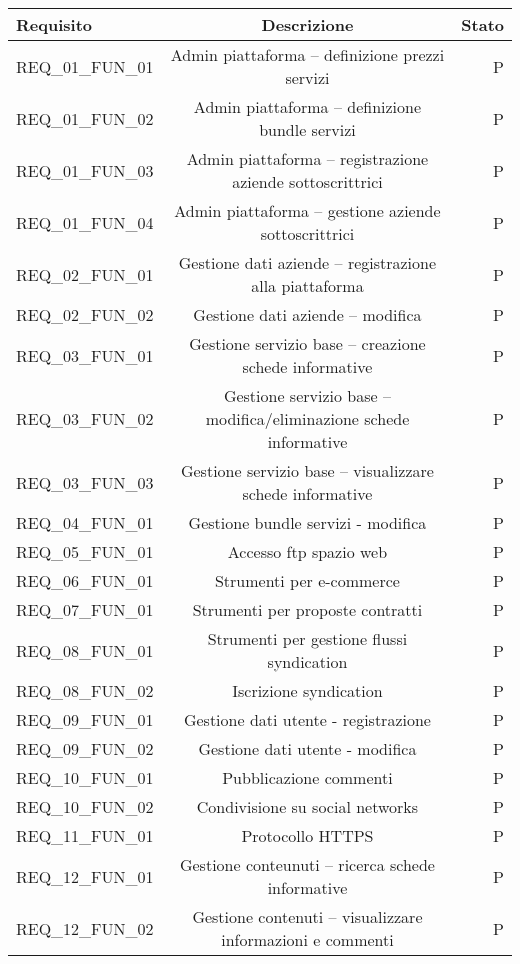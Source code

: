 

\begin{tabular}{||l||c|r||}
\hline
\hline
Requisito & Descrizione & Stato\\
\hline
\hline
REQ\_01\_FUN\_01 & Admin piattaforma – definizione prezzi servizi & P\\
\hline
REQ\_01\_FUN\_02 & Admin piattaforma – definizione bundle servizi & P\\
\hline
REQ\_01\_FUN\_03 & Admin piattaforma – registrazione aziende sottoscrittrici & P\\
\hline
REQ\_01\_FUN\_04 & Admin piattaforma – gestione aziende sottoscrittrici & P\\
\hline
REQ\_02\_FUN\_01 & Gestione dati aziende – registrazione alla piattaforma & P\\
\hline
REQ\_02\_FUN\_02 & Gestione dati aziende – modifica & P\\
\hline
REQ\_03\_FUN\_01 & Gestione servizio base – creazione schede informative & P\\
\hline
REQ\_03\_FUN\_02 & Gestione servizio base – modifica/eliminazione schede informative & P\\
\hline
REQ\_03\_FUN\_03 & Gestione servizio base – visualizzare schede informative & P\\
\hline
REQ\_04\_FUN\_01 & Gestione bundle servizi - modifica & P\\
\hline
REQ\_05\_FUN\_01 & Accesso ftp spazio web & P\\
\hline
REQ\_06\_FUN\_01 & Strumenti per e-commerce & P\\
\hline
REQ\_07\_FUN\_01 & Strumenti per proposte contratti & P\\
\hline
REQ\_08\_FUN\_01 & Strumenti per gestione flussi syndication & P\\
\hline
REQ\_08\_FUN\_02 & Iscrizione syndication & P\\
\hline
REQ\_09\_FUN\_01 & Gestione dati utente - registrazione & P\\
\hline
REQ\_09\_FUN\_02 & Gestione dati utente - modifica & P\\
\hline
REQ\_10\_FUN\_01 & Pubblicazione commenti & P\\
\hline
REQ\_10\_FUN\_02 & Condivisione su social networks & P\\
\hline
REQ\_11\_FUN\_01 & Protocollo HTTPS & P\\
\hline
REQ\_12\_FUN\_01 & Gestione conteunuti – ricerca schede informative & P\\
\hline
REQ\_12\_FUN\_02 & Gestione contenuti – visualizzare informazioni e commenti & P\\
\hline
\hline
\end{tabular}




